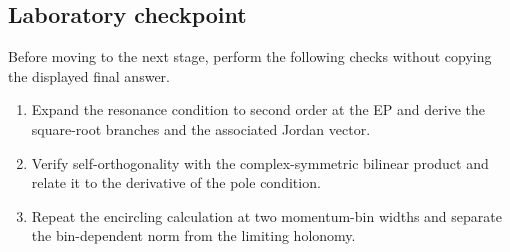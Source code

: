 \subsection*{Laboratory checkpoint}
Before moving to the next stage, perform the following checks without copying
the displayed final answer.
\begin{enumerate}
  \item Expand the resonance condition to second order at the EP and derive the square-root branches and the associated Jordan vector.
  \item Verify self-orthogonality with the complex-symmetric bilinear product and relate it to the derivative of the pole condition.
  \item Repeat the encircling calculation at two momentum-bin widths and separate the bin-dependent norm from the limiting holonomy.
\end{enumerate}
